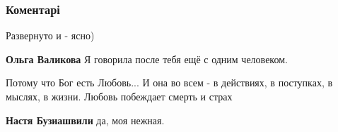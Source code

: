  
 
 
 
 
\subsubsection{Коментарі}

\begin{itemize}

 
Развернуто и - ясно)

\begin{itemize}
 
\textbf{Ольга Валикова} Я говорила после тебя ещё с одним человеком.
\end{itemize}

 
Потому что Бог есть Любовь... И она во всем - в действиях, в поступках, в
мыслях, в жизни. Любовь побеждает смерть и страх

\begin{itemize}
 
\textbf{Настя Бузиашвили} да, моя нежная.
\end{itemize}

 


\end{itemize}
